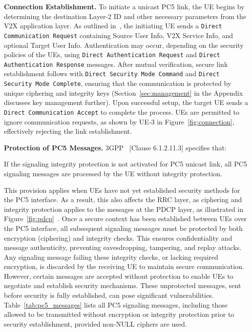 \textbf{Connection Establishment.} To initiate a unicast PC5 link, the UE begins by determining the destination Layer-2 ID and other necessary parameters from the V2X application layer. As outlined in~\cite{3gpp.33.536}, the initiating UE sends a \texttt{Direct Communication Request} containing Source User Info, V2X Service Info, and optional Target User Info. Authentication may occur, depending on the security policies of the UEs, using \texttt{Direct Authentication Request} and \texttt{Direct Authentication Response} messages. After mutual verification, secure link establishment follows with \texttt{Direct Security Mode Command} and \texttt{Direct Security Mode Complete}, ensuring that the communication is protected by unique ciphering and integrity keys (Section~\ref{sec:management} in the Appendix discusses key management further). Upon successful setup, the target UE sends a \texttt{Direct Communication Accept} to complete the process. UEs are permitted to ignore communication requests, as shown by UE-3 in Figure~\ref{fig:connection}, effectively rejecting the link establishment.

\textbf{Protection of PC5 Messages.} 3GPP~\cite{3gpp.24.587} [Clause 6.1.2.11.3] specifies that:

\begin{fancyquote}[]
If the signaling integrity protection is not activated for PC5 unicast link, all PC5 signaling messages are processed by the UE without integrity protection.
\end{fancyquote}

This provision applies when UEs have not yet established security methods for the PC5 interface. As a result, this also affects the RRC layer, as ciphering and integrity protection applies to the messages at the PDCP layer, as illustrated in Figure~\ref{fig:pdcp}~\cite{3gpp.33.536}. Once a secure context has been established between UEs over the PC5 interface, all subsequent signaling messages must be protected by both encryption (ciphering) and integrity checks. This ensures confidentiality and message authenticity, preventing eavesdropping, tampering, and replay attacks. Any signaling message failing these integrity checks, or lacking required encryption, is discarded by the receiving UE to maintain secure communication. However, certain messages are accepted without protection to enable UEs to negotiate and establish security mechanisms. These unprotected messages, sent before security is fully established, can pose significant vulnerabilities. Table~\ref{tab:pc5_messages} lists all PC5 signaling messages, including those allowed to be transmitted without encryption or integrity protection prior to security establishment, provided non-NULL ciphers are used.

